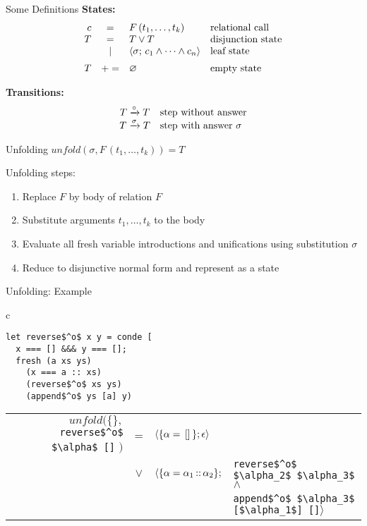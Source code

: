 \documentclass[14pt,aspectratio=169]{beamer}
\let\\\tabularnewline
\let\\\tabularnewline
\newcommand{\set}[1]{\{#1\}}
\newcommand{\inbr}[1]{\langle #1 \rangle}
\renewcommand{\emptyset}{\varnothing}
\theoremstyle{definition}
\begin{document}
\begin{frame}[fragile]{Some Definitions}
\textbf{States:}
\[
\begin{array}{rcll}
  c & = & F\,(t_1,\dots,t_k) & \mbox{relational call} \\
  T & = & T \lor T & \mbox{disjunction state} \\
               & \mid & \inbr{\sigma;\, c_1 \land \dots \land c_n} & \mbox{leaf state}\\[2mm]
T & +=& \emptyset & \mbox{empty state}
\end{array}
\]

\textbf{Transitions:}
\[
\begin{array}{cl}
T \xrightarrow{\circ} T  & \mbox{step without answer} \\
T \xrightarrow{\sigma} T & \mbox{step with answer } \sigma
\end{array}
\]
\end{frame}

\begin{frame}[fragile]{Unfolding}
$unfold(\sigma, F\,(t_1,\dots,t_k)) = T$
\vskip1cm

Unfolding steps:
\begin{enumerate}
    \item Replace $F$ by body of relation $F$
    \item Substitute arguments $t_1,\dots,t_k$ to the body
    \item Evaluate all fresh variable introductions and unifications using substitution $\sigma$ 
    \item Reduce to disjunctive normal form and represent as a state
\end{enumerate}

\end{frame}

\begin{frame}[fragile]{Unfolding: Example}
  \begin{center}
  \begin{tabular}{c}
\begin{lstlisting}
let reverse$^o$ x y = conde [ 
  x === [] &&& y === []; 
  fresh (a xs ys) 
    (x === a :: xs)
    (reverse$^o$ xs ys)
    (append$^o$ ys [a] y)
\end{lstlisting} \\
\end{tabular}
\vskip1cm
\begin{tabular}{rcll}
  $unfold(\set{},$ \lstinline|reverse$^o$ $\alpha$ []| $)$ & = & 
  $\inbr{\set{\alpha = \lstinline|[]|}; \epsilon}$ \\
  & $\lor$ & $\langle\set{\alpha = \alpha_1 \lstinline|::| \alpha_2};$ & \lstinline|reverse$^o$ $\alpha_2$ $\alpha_3$| $\land$ \\
  & & & \lstinline|append$^o$ $\alpha_3$ [$\alpha_1$] []|$\rangle$
\end{tabular}
  \end{center}
\end{frame}
\end{document}

